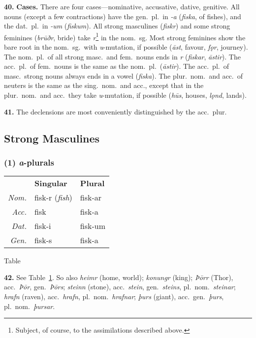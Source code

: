 \documentclass[12pt,letterpaper]{book}
\newcommand\newcaption{\small\refstepcounter{table}%
	\centering Table~\thetable}
\begin{document}
\textbf{40.} \textbf{Cases.}  There are four cases---nominative, accusative,
dative, genitive.  All nouns (except a few contractions) have the
gen.\ pl.\ in \textit{-a} (\textit{fiska}, of fishes), and the dat.\ pl.\ in
\textit{-um} (\textit{fiskum}).  All strong masculines (\textit{fiskr}) and
some strong feminines (\textit{brūðr}, bride) take \textit{r}\footnote{Subject,
of course, to the assimilations described above.} in the nom.\ sg.  Most
strong feminines show the bare root in the nom.\ sg.\ with \textit{u}-mutation,
if possible (\textit{āst}, favour, \textit{fǫr}, journey).  The nom.\ pl.\ of all
strong masc.\ and fem.\ nouns ends in \textit{r} (\textit{fiskar}, \textit{āstir}).
The acc.\ pl.\ of fem.\ nouns is the same as the nom.\ pl.\ (\textit{āstir}).
The acc.\ pl.\ of masc.\ strong nouns always ends in a vowel (\textit{fiska}).
The plur.\ nom.\ and acc.\ of neuters is the same as the sing.\ nom.\ and
acc., except that in the plur.\ nom.\ and acc.\ they take \textit{u}-mutation,
if possible (\textit{hūs}, houses, \textit{lǫnd}, lands).

\textbf{41.} The declensions are most conveniently distinguished by the
acc.\ plur.

\subsection{Strong Masculines}

\subsubsection{(1) \textit{a}-plurals}

\begin{table}[htbp]
\begin{center}
\begin{tabular}{rll}
	& \textbf{Singular} & \textbf{Plural} \\
	\textit{Nom.} & fisk-r (\textit{fish}) & fisk-ar \\
	\textit{Acc.} & fisk & fisk-a \\
	\textit{Dat.} & fisk-i & fisk-um \\
	\textit{Gen.} & fisk-s & fisk-a \\
\end{tabular}
\end{center}
\newcaption
\label{tab:42}
\end{table}

\textbf{42.}  See Table~\ref{tab:42}.  So also \textit{heimr} (home, world);
\textit{konungr} (king); \textit{Þōrr} (Thor), acc.\ \textit{Þōr},
gen.\ \textit{Þōrs}; \textit{steinn} (stone), acc.\ \textit{stein},
gen.\ \textit{steins}, pl.\ nom.\ \textit{steinar}; \textit{hrafn} (raven),
acc.\ \textit{hrafn}, pl.\ nom.\ \textit{hrafnar}; \textit{þurs} (giant),
acc.\ gen.\ \textit{þurs}, pl.\ nom.\ \textit{þursar}.
\end{document}
